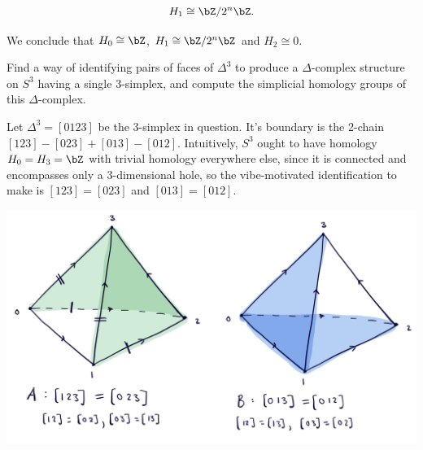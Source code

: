 \begin{homework}[e]
\begin{prf}
\begin{itemize}
      \begin{align*}
        H_1 \cong \bZ/2^{n}\bZ.
      \end{align*}
  \end{itemize}
  We conclude that $H_0 \cong \bZ$, $H_1 \cong \bZ/2^{n}\bZ$ and $H_2 \cong 0$.
  \end{prf}
  \prob[2.1.7] Find a way of identifying pairs of faces of $\Delta^3$ to produce a $\Delta$-complex structure on $S^3$ having a single $3$-simplex, and compute the simplicial homology groups of this $\Delta$-complex.
  \begin{prf}
    Let $\Delta^3 = [0 1 2 3]$ be the $3$-simplex in question. It's boundary is the 2-chain $[123] - [023] + [013] - [012]$. Intuitively, $S^3$ ought to have homology $H_0 = H_3 = \bZ$ with trivial homology everywhere else, since it is connected and encompasses only a 3-dimensional hole, so the vibe-motivated identification to make is $[123] = [023]$ and $[013] = [012]$.
    \begin{center}
      \includegraphics[width=15cm]{figures/hwk8-fig4.png}
      \label{fig:prob3-1}
    \end{center}


\end{prf}
\end{homework}
